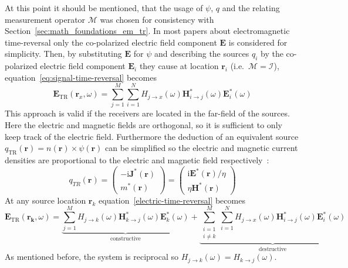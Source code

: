At this point it should be mentioned, that the usage of \(\psi \), \(q\) and the relating measurement operator \(\mathcal{M}\) was chosen for consistency with Section~\ref{sec:math_foundations_em_tr}.
In most papers about electromagnetic time-reversal only the co-polarized electric field component \(\bm{E}\) is considered for simplicity.
Then, by substituting \(\bm{E}\) for \(\psi \) and describing the sources \(q_i\) by the co-polarized electric field component \(\bm{E}_i\) they cause at location \(\bm{r}_i\) (i.e.~\(\mathcal{M}=\mathcal{I}\)), equation~\eqref{eq:signal-time-reversal} becomes
\begin{equation}\label{electric-time-reversal}
    \bm{E}_{\text{TR}}(\bm{r}_x, \omega) = \sum_{j=1}^{M} \sum_{i=1}^{N} H_{j\rightarrow x}(\omega )  \bm{H}^*_{i\rightarrow j}(\omega) \bm{E}^*_i(\omega)
\end{equation}
This approach is valid if the receivers are located in the far-field of the sources.
Here the electric and magnetic fields are orthogonal, so it is sufficient to only keep track of the electric field.
Furthermore the deduction of an equivalent source \(q_{\text{TR}}(\bm{r}) = n(\bm{r}) \times \psi(\bm{r})\) can be simplified so the electric and magnetic current densities are proportional to the electric and magnetic field respectively~\parencite{de_rosny_theory_2010}:
\begin{equation}
    q_{T R}(\bm{r})= \begin{pmatrix}
        -\mathrm{i} \bm{J}^*(\bm{r}) \\
        m^*(\bm{r})
    \end{pmatrix} =\left(\begin{array}{c}
        \mathrm{i} \bm{E}^*(\bm{r}) / \eta \\
        \eta \bm{H}^*(\bm{r})
        \end{array}\right)
\end{equation}
At any source location \(\bm{r}_k\) equation~\eqref{electric-time-reversal} becomes
\begin{equation}\label{electric-time-reversal-source}
    \bm{E}_{\text{TR}}(\bm{r_k}, \omega) = \underbrace{\sum_{j=1}^{M} H_{j\rightarrow k}(\omega) \bm{H}^*_{k\rightarrow j}(\omega) \bm{E}^*_k(\omega)}_{\text{constructive}} + \underbrace{\sum_{\substack{i=1 \\ i \neq k}}^{M} \sum_{i=1}^{N} H_{j\rightarrow x}(\omega ) \bm{H}^*_{i\rightarrow j}(\omega) \bm{E}^*_i(\omega)}_{\text{destructive}}
\end{equation}
As mentioned before, the system is reciprocal so \(H_{j\rightarrow k}(\omega )= H_{k\rightarrow j}(\omega )\). 
